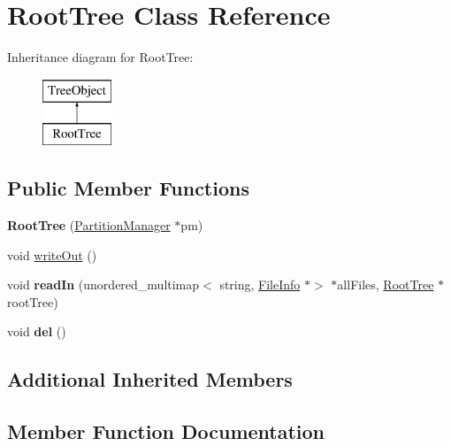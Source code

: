 \hypertarget{classRootTree}{}\section{Root\+Tree Class Reference}
\label{classRootTree}
Inheritance diagram for Root\+Tree\+:\begin{figure}[H]
\begin{center}
\leavevmode
\includegraphics[height=2.000000cm]{classRootTree}
\end{center}
\end{figure}
\subsection*{Public Member Functions}
\begin{DoxyCompactItemize}
\item 
\mbox{\label{classRootTree_a491c0374c9024faf1e1c8045f21a4cad}} 
{\bfseries Root\+Tree} (\mbox{\hyperlink{classPartitionManager}{Partition\+Manager}} $\ast$pm)
\item 
void \mbox{\hyperlink{classRootTree_a6df5a227c60c44ad84207eb296c52af9}{write\+Out}} ()
\item 
\mbox{\label{classRootTree_a1d1084e9fc3333f10b3146d096da1dd4}} 
void {\bfseries read\+In} (unordered\+\_\+multimap$<$ string, \mbox{\hyperlink{classFileInfo}{File\+Info}} $\ast$$>$ $\ast$all\+Files, \mbox{\hyperlink{classRootTree}{Root\+Tree}} $\ast$root\+Tree)
\item 
\mbox{\label{classRootTree_ac431dc04b767fc66791c251d8173650d}} 
void {\bfseries del} ()
\end{DoxyCompactItemize}
\subsection*{Additional Inherited Members}


\subsection{Member Function Documentation}
\mbox{\label{classRootTree_a6df5a227c60c44ad84207eb296c52af9}} 
